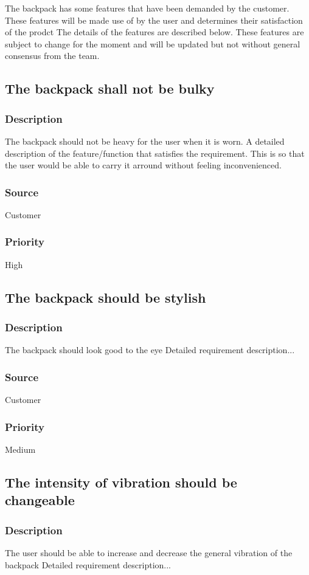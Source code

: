 The backpack has some features that have been demanded by the customer. These features will be made use of by the user and determines their satisfaction of the prodct  The details of the features are described below. These features are subject to change for the moment and will be updated but not without general consensus from the team.
\subsection{The backpack shall not be bulky}
\subsubsection{Description}
The backpack should not be heavy for the user when it is worn. A detailed description of the feature/function that satisfies the requirement. This is so that the user would be able to carry it arround without feeling  inconvenienced.
\subsubsection{Source}
Customer 
\subsubsection{Priority}
High

\subsection{The backpack should be stylish}
\subsubsection{Description}
The backpack should look good to the eye
Detailed requirement description...
\subsubsection{Source}
Customer
\subsubsection{Priority}
Medium

\subsection{The intensity of vibration should be changeable }
\subsubsection{Description}
The user should be able to increase and decrease the general vibration of the backpack
Detailed requirement description...
